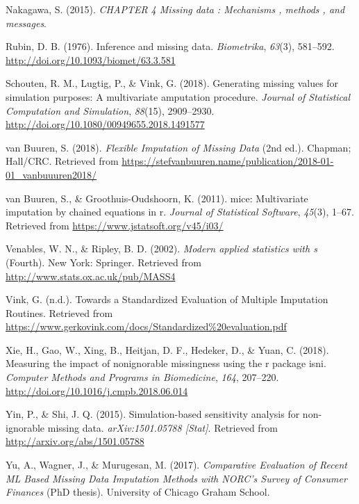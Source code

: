\documentclass[12pt,oneside]{chicagocapstone}
\begin{document}
\hypertarget{ref-nakagawa_chapter_2015}{}
Nakagawa, S. (2015). \emph{CHAPTER 4 Missing data : Mechanisms , methods
, and messages}.

\hypertarget{ref-rubin_inference_1976}{}
Rubin, D. B. (1976). Inference and missing data. \emph{Biometrika},
\emph{63}(3), 581--592. \url{http://doi.org/10.1093/biomet/63.3.581}

\hypertarget{ref-schouten_generating_2018}{}
Schouten, R. M., Lugtig, P., \& Vink, G. (2018). Generating missing
values for simulation purposes: A multivariate amputation procedure.
\emph{Journal of Statistical Computation and Simulation}, \emph{88}(15),
2909--2930. \url{http://doi.org/10.1080/00949655.2018.1491577}

\hypertarget{ref-van_buuren_flexible_2018}{}
van Buuren, S. (2018). \emph{Flexible Imputation of Missing Data} (2nd
ed.). Chapman; Hall/CRC. Retrieved from
\url{https://stefvanbuuren.name/publication/2018-01-01_vanbuuuren2018/}

\hypertarget{ref-mice_package}{}
van Buuren, S., \& Groothuis-Oudshoorn, K. (2011). mice: Multivariate
imputation by chained equations in r. \emph{Journal of Statistical
Software}, \emph{45}(3), 1--67. Retrieved from
\url{https://www.jstatsoft.org/v45/i03/}

\hypertarget{ref-mass_package}{}
Venables, W. N., \& Ripley, B. D. (2002). \emph{Modern applied
statistics with s} (Fourth). New York: Springer. Retrieved from
\url{http://www.stats.ox.ac.uk/pub/MASS4}

\hypertarget{ref-vink_towards_nodate}{}
Vink, G. (n.d.). Towards a Standardized Evaluation of Multiple
Imputation Routines. Retrieved from
\url{https://www.gerkovink.com/docs/Standardized\%20evaluation.pdf}

\hypertarget{ref-xie_measuring_2018}{}
Xie, H., Gao, W., Xing, B., Heitjan, D. F., Hedeker, D., \& Yuan, C.
(2018). Measuring the impact of nonignorable missingness using the r
package isni. \emph{Computer Methods and Programs in Biomedicine},
\emph{164}, 207--220. \url{http://doi.org/10.1016/j.cmpb.2018.06.014}

\hypertarget{ref-yin_simulation_based_2015}{}
Yin, P., \& Shi, J. Q. (2015). Simulation-based sensitivity analysis for
non-ignorable missing data. \emph{arXiv:1501.05788 {[}Stat{]}}.
Retrieved from \url{http://arxiv.org/abs/1501.05788}

\hypertarget{ref-yu_comparative_2017}{}
Yu, A., Wagner, J., \& Murugesan, M. (2017). \emph{Comparative
Evaluation of Recent ML Based Missing Data Imputation Methods with
NORC's Survey of Consumer Finances} (PhD thesis). University of Chicago
Graham School.


\end{document}
